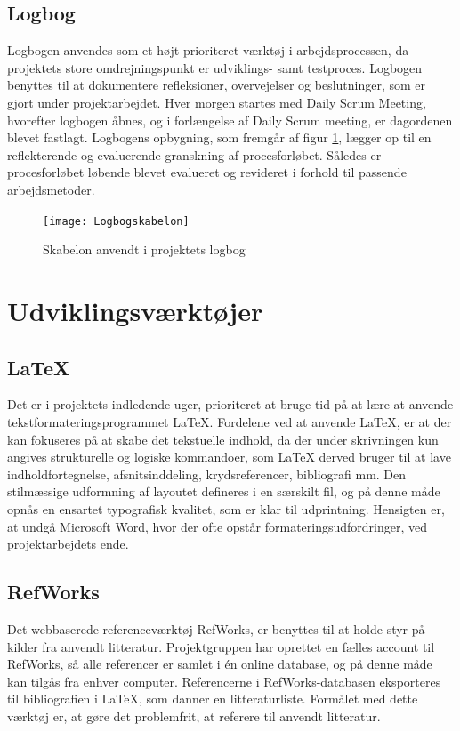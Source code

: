 	\subsection{Logbog}
	Logbogen anvendes som et højt prioriteret værktøj i arbejdsprocessen, da projektets store omdrejningspunkt er udviklings- samt testproces. Logbogen benyttes til at dokumentere refleksioner, overvejelser og beslutninger, som er gjort under projektarbejdet. Hver morgen startes med Daily Scrum Meeting, hvorefter logbogen åbnes, og i forlængelse af Daily Scrum meeting, er dagordenen blevet  fastlagt. Logbogens opbygning, som fremgår af figur \ref{fig:logbog}, lægger op til en reflekterende og evaluerende granskning af procesforløbet. Således er procesforløbet løbende blevet evalueret og revideret i forhold til passende arbejdsmetoder. 
	
	\begin{figure}[htb]
	\centering
	\texttt{[image: Logbogskabelon]}
	\caption{Skabelon anvendt i projektets logbog}
	\label{fig:logbog}	
	\end{figure}	

\section{Udviklingsværktøjer}
	 
	\subsection{\LaTeX}
Det er i projektets indledende uger, prioriteret at bruge tid på at lære at anvende tekstformateringsprogrammet \LaTeX. Fordelene ved at anvende LaTeX, er at der kan fokuseres på at skabe det tekstuelle indhold, da der under skrivningen kun angives strukturelle og logiske kommandoer, som LaTeX derved bruger til at lave indholdfortegnelse, afsnitsinddeling, krydsreferencer, bibliografi mm. Den stilmæssige udformning af layoutet defineres i en særskilt fil, og på denne måde opnås en ensartet typografisk kvalitet, som er klar til udprintning. Hensigten er, at undgå Microsoft Word, hvor der ofte opstår formateringsudfordringer, ved projektarbejdets ende. 
    
	\subsection{RefWorks}
Det webbaserede referenceværktøj RefWorks, er benyttes til at holde styr på kilder fra anvendt litteratur. Projektgruppen har oprettet en fælles account til RefWorks, så alle referencer er samlet i én online database, og på denne måde kan tilgås fra enhver computer. Referencerne i RefWorks-databasen eksporteres til bibliografien i LaTeX, som danner en litteraturliste. Formålet med dette værktøj er, at gøre det problemfrit, at referere til anvendt litteratur. 


